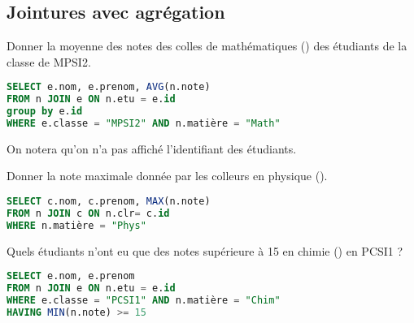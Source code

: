 \subsection{Jointures avec agrégation} 
\begin{Exercise}
Donner la moyenne des notes des colles de mathématiques () des étudiants de la classe de MPSI2.
\end{Exercise}
\begin{Answer}
\begin{lstlisting}[language=SQL]
SELECT e.nom, e.prenom, AVG(n.note)
FROM n JOIN e ON n.etu = e.id
group by e.id
WHERE e.classe = "MPSI2" AND n.matière = "Math"
\end{lstlisting}
On notera qu'on n'a pas affiché l'identifiant des étudiants.
\end{Answer}
\begin{Exercise}
Donner la note maximale donnée par les colleurs en physique  ().
\end{Exercise}
\begin{Answer}
\begin{lstlisting}[language=SQL]
SELECT c.nom, c.prenom, MAX(n.note)
FROM n JOIN c ON n.clr= c.id
WHERE n.matière = "Phys"
\end{lstlisting}
\end{Answer}
\begin{Exercise}
Quels étudiants n'ont eu que des notes supérieure à 15 en chimie () en PCSI1 ?
\end{Exercise}
\begin{Answer}
\begin{lstlisting}[language=SQL]
SELECT e.nom, e.prenom
FROM n JOIN e ON n.etu = e.id
WHERE e.classe = "PCSI1" AND n.matière = "Chim"
HAVING MIN(n.note) >= 15
\end{lstlisting}
\end{Answer}
